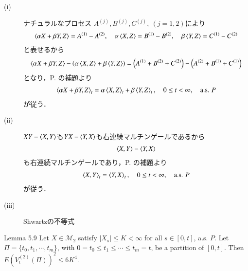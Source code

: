 	\begin{prf}\mbox{}
		\begin{description}
			\item[(i)] ナチュラルなプロセス
				$A^{(j)},B^{(j)},C^{(j)},\ (j=1,2)$により
				\begin{align}
					\inprod<\alpha X + \beta Y, Z> = A^{(1)} - A^{(2)},
					\quad \alpha \inprod<X,Z> = B^{(1)} - B^{(2)},
					\quad \beta \inprod<Y,Z> = C^{(1)} - C^{(2)}
				\end{align}
				と表せるから
				\begin{align}
					\inprod<\alpha X + \beta Y, Z> 
					- \left(\alpha \inprod<X,Z> + \beta \inprod<Y,Z>\right)
					= \left(A^{(1)} + B^{(2)} + C^{(2)}\right)
					- \left(A^{(2)} + B^{(1)} + C^{(1)}\right)
				\end{align}
				となり，P. \pageref{lem:uniqueness_of_Doob_Meyer_decomposition}の補題より
				\begin{align}
					\inprod<\alpha X + \beta Y, Z>_t 
					= \alpha \inprod<X,Z>_t + \beta \inprod<Y,Z>_t,
					\quad 0 \leq t < \infty,
					\quad \mbox{a.s. $P$}
				\end{align}
				が従う．
			
			\item[(ii)] 
				$XY - \inprod<X,Y>$も$YX - \inprod<Y,X>$も右連続マルチンゲールであるから
				\begin{align}
					\inprod<X,Y> - \inprod<Y,X>
				\end{align}
				も右連続マルチンゲールであり，P. \pageref{lem:uniqueness_of_Doob_Meyer_decomposition}の補題より
				\begin{align}
					\inprod<X,Y>_t = \inprod<Y,X>_t,
					\quad 0 \leq t < \infty,
					\quad \mbox{a.s. $P$}
				\end{align}
				が従う．

			\item[(iii)] Shwartzの不等式
		\end{description}
	\end{prf}
	
	\begin{itembox}[l]{Lemma 5.9}
		Let $X \in \mathscr{M}_2$ satisfy $|X_s| \leq K < \infty$ for all $s \in [0,t]$,
		a.s. $P$. Let $\Pi = \{t_0,t_1,\cdots,t_m\}$, with $0 = t_0 \leq t_1 \leq \cdots \leq
		t_m = t$, be a partition of $[0,t]$. Then $E\left( V_t^{(2)}(\Pi) \right)^2 \leq 6K^4$.
	\end{itembox}
	
